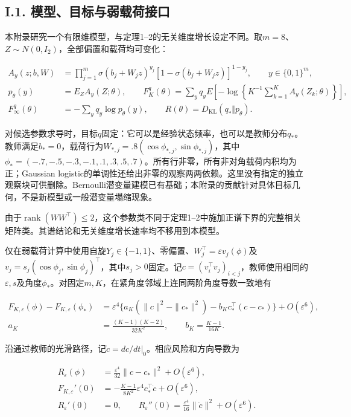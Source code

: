 \documentclass[11pt,a4paper]{article}
\begin{document}
\subsection*{I.1. 模型、目标与弱载荷接口}\label{dense-model}

本附录研究一个有限维模型，与定理1--2的无关维度增长设定不同。取\(m=8\)、\(Z\sim N(0,I_2)\)，全部偏置和载荷均可变化：

\[
\begin{aligned}
A_y(z;b,W)&=\prod_{j=1}^m\sigma(b_j+W_jz)^{y_j}
[1-\sigma(b_j+W_jz)]^{1-y_j},\qquad y\in\{0,1\}^m,\\
p_\theta(y)&=E_ZA_y(Z;\theta),\qquad
F_K^q(\theta)=\sum_yq_yE\left[-\log\left\{K^{-1}\sum_{k=1}^KA_y(Z_k;\theta)\right\}\right],\\
F_\infty^q(\theta)&=-\sum_yq_y\log p_\theta(y),\qquad
R(\theta)=D_{\mathrm{KL}}(q_*\Vert p_\theta).
\end{aligned}
\tag{I.1}
\]

对候选参数求导时，目标\(q\)固定：它可以是经验状态频率，也可以是教师分布\(q_*\)。教师满足\(b_*=0\)，载荷行为\(W_{*,j}=.8(\cos\phi_{*,j},\sin\phi_{*,j})\)，其中\(\phi_*=(-.7,-.5,-.3,-.1,.1,.3,.5,.7)\)。所有行非零，所有非对角载荷内积均为正；Gaussian
logistic的单调性还给出非零的观察两两依赖。这里没有指定的独立观察块可供删除。Bernoulli潜变量建模已有基础\citep{tipping1998}；本附录的贡献针对具体目标几何，不是新模型或一般潜变量塌缩现象\citep{burda2016, lucas2019, urban2021}。

由于\(\operatorname{rank}(WW^\top)\le2\)，这个参数类不同于定理1--2中施加正谱下界的完整相关矩阵类。其谱结论和无关维度增长速率均不移用到本模型。

仅在弱载荷计算中使用自旋\(Y_j\in\{-1,1\}\)、零偏置、\(W_j^\top=\varepsilon v_j(\phi)\)及\(v_j=s_j(\cos\phi_j,\sin\phi_j)^\top\)，其中\(s_j>0\)固定。记\(c=(v_i^\top v_j)_{i<j}\)，教师使用相同的\(\varepsilon,s\)及角度\(\phi_*\)。对固定\(m,K\)，在紧角度邻域上连同两阶角度导数一致地有

\[
\begin{aligned}
F_{K,\varepsilon}(\phi)-F_{K,\varepsilon}(\phi_*)
&=\varepsilon^4\{a_K(\|c\|^2-\|c_*\|^2)-b_Kc_*^\top(c-c_*)\}+O(\varepsilon^6),\\
a_K&=\frac{(K-1)(K-2)}{32K^2},\qquad b_K=\frac{K-1}{16K}.
\end{aligned}
\tag{I.2}
\]

沿通过教师的光滑路径，记\(\dot c=dc/dt|_0\)。相应风险和方向导数为

\[
\begin{aligned}
R_\varepsilon(\phi)&=\frac{\varepsilon^4}{32}\|c-c_*\|^2+O(\varepsilon^6),\\
F_{K,\varepsilon}'(0)&=-\frac{K-1}{8K^2}\varepsilon^4c_*^\top\dot c+O(\varepsilon^6),\\
R_\varepsilon'(0)&=0,\qquad
R_\varepsilon''(0)=\frac{\varepsilon^4}{16}\|\dot c\|^2+O(\varepsilon^6).
\end{aligned}
\tag{I.3}
\]
\end{document}
